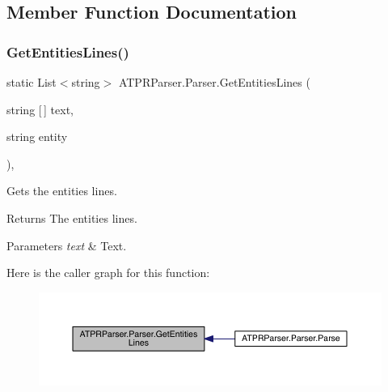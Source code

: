 \subsection{Member Function Documentation}
\hypertarget{class_a_t_p_r_parser_1_1_parser_ae5268f6e00d7c5a30a7cb8f463892772}{}\label{class_a_t_p_r_parser_1_1_parser_ae5268f6e00d7c5a30a7cb8f463892772} 
\subsubsection{\texorpdfstring{Get\+Entities\+Lines()}{GetEntitiesLines()}}
{\footnotesize\ttfamily static List$<$string$>$ A\+T\+P\+R\+Parser.\+Parser.\+Get\+Entities\+Lines (\begin{DoxyParamCaption}\item[{string \mbox{[}$\,$\mbox{]}}]{text,  }\item[{string}]{entity }\end{DoxyParamCaption})\hspace{0.3cm}{\ttfamily [inline]}, {\ttfamily [static]}}



Gets the entities lines. 

\begin{DoxyReturn}{Returns}
The entities lines.
\end{DoxyReturn}

\begin{DoxyParams}{Parameters}
{\em text} & Text.\\
\hline
\end{DoxyParams}
Here is the caller graph for this function\+:
\nopagebreak
\begin{figure}[H]
\begin{center}
\leavevmode
\includegraphics[width=350pt]{df/d53/class_a_t_p_r_parser_1_1_parser_ae5268f6e00d7c5a30a7cb8f463892772_icgraph}
\end{center}
\end{figure}
\hypertarget{class_a_t_p_r_parser_1_1_parser_a853c07acd90bab8533ae613fd05f3057}{}\label{class_a_t_p_r_parser_1_1_parser_a853c07acd90bab8533ae613fd05f3057} 
